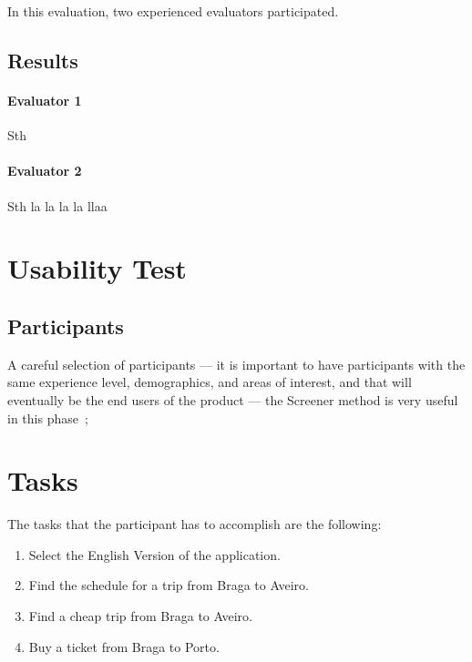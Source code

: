 \documentclass[a4paper]{article}
\begin{document}
In this evaluation, two experienced evaluators participated.

\subsection{Results}

\paragraph{Evaluator 1} Sth

\paragraph{Evaluator 2} Sth la la la la llaa

\section{Usability Test}

\subsection{Participants}
A careful selection of participants --- it is important to have participants with the same experience level, demographics, and areas of interest, and that will eventually be the end users of the product --- the Screener method is very useful in this phase~\citep{mitchell2007step};


\section{Tasks}


The tasks that the participant has to accomplish are the following:

\begin{enumerate}
  \item Select the English Version of the application.
  \item Find the schedule for a trip from Braga to Aveiro.
  \item Find a cheap trip from Braga to Aveiro.
  \item Buy a ticket from Braga to Porto.
\end{enumerate}
\end{document}
